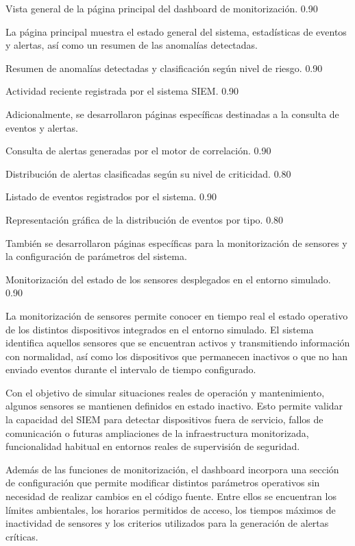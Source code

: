 {Vista general de la página principal del dashboard de monitorización.}
{0.90}

La página principal muestra el estado general del sistema, estadísticas de eventos y alertas, así como un resumen de las anomalías detectadas.

{Resumen de anomalías detectadas y clasificación según nivel de riesgo.}
{0.90}

{Actividad reciente registrada por el sistema SIEM.}
{0.90}

Adicionalmente, se desarrollaron páginas específicas destinadas a la consulta de eventos y alertas.

{Consulta de alertas generadas por el motor de correlación.}
{0.90}

{Distribución de alertas clasificadas según su nivel de criticidad.}
{0.80}

{Listado de eventos registrados por el sistema.}
{0.90}

{Representación gráfica de la distribución de eventos por tipo.}
{0.80}

También se desarrollaron páginas específicas para la monitorización de sensores y la configuración de parámetros del sistema.

{Monitorización del estado de los sensores desplegados en el entorno simulado.}
{0.90}

La monitorización de sensores permite conocer en tiempo real el estado operativo de los distintos dispositivos integrados en el entorno simulado. El sistema identifica aquellos sensores que se encuentran activos y transmitiendo información con normalidad, así como los dispositivos que permanecen inactivos o que no han enviado eventos durante el intervalo de tiempo configurado.

Con el objetivo de simular situaciones reales de operación y mantenimiento, algunos sensores se mantienen definidos en estado inactivo. Esto permite validar la capacidad del SIEM para detectar dispositivos fuera de servicio, fallos de comunicación o futuras ampliaciones de la infraestructura monitorizada, funcionalidad habitual en entornos reales de supervisión de seguridad.

Además de las funciones de monitorización, el dashboard incorpora una sección de configuración que permite modificar distintos parámetros operativos sin necesidad de realizar cambios en el código fuente. Entre ellos se encuentran los límites ambientales, los horarios permitidos de acceso, los tiempos máximos de inactividad de sensores y los criterios utilizados para la generación de alertas críticas.

